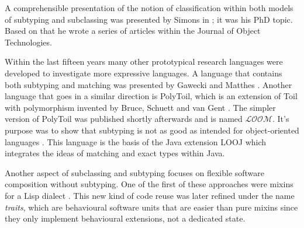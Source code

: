 A comprehensible presentation of the notion of classification within
both models of subtyping and subclassing was presented by Simons in
\cite{simons_theory_2002-2}; it was his PhD topic. Based on that he
wrote a series of articles within the Journal of Object Technologies.

Within the last fifteen years many other prototypical research
languages were developed to investigate more expressive languages. A
language that contains both subtyping and matching was presented
by Gawecki and Matthes \cite{gawecki_tool:_1995}. Another language
that goes in a similar direction is PolyToil, which is an extension
of Toil with polymorphism invented by Bruce, Schuett and van Gent
\cite{bruce_polytoil:_1995}. The simpler version of PolyToil was published
shortly afterwards and is named $\mathcal{LOOM}$. It's purpose was
to show that subtyping is not as good as intended for object-oriented
languages \cite{bruce_subtyping_1997}. This language is the basis of
the Java extension LOOJ which integrates the ideas of matching and exact
types within Java.

Another aspect of subclassing and subtyping focuses on
flexible software composition without subtyping. One of
the first of these approaches were mixins for a Lisp dialect
\cite{bracha_mixin-based_1990}. This new kind of code reuse was later
refined under the name \emph{traits}, which are behavioural software
units \cite{schaerli_traits:_2003,ducasse_traits:_2006} that are easier
than pure mixins since they only implement behavioural extensions,
not a dedicated state.

